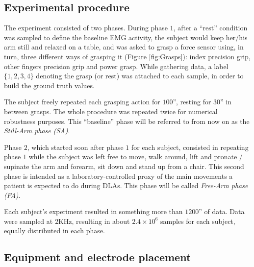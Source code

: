 \documentclass[10pt]{bmc_article}
\def\texttt{[image: ]}
\newenvironment{bmcformat}
  {\begin{raggedright}\baselineskip20pt\sloppy\setboolean{publ}{false}}
  {\end{raggedright}\baselineskip20pt\sloppy}
\begin{document}
\begin{bmcformat}
\subsection*{Experimental procedure}

The experiment consisted of two phases.
During phase $1$, after a ``rest'' condition was sampled to define the baseline
EMG activity, the subject would keep her/his arm still and relaxed
on a table, and was asked to grasp a force sensor using, in turn,
three different ways of grasping it (Figure \ref{fig:Grasps}):
index precision grip, other fingers precision grip and power grasp.
While gathering data, a label $\{1,2,3,4\}$ denoting the grasp (or rest)
was attached to each sample, in order to build the ground truth values.


The subject freely repeated each grasping action for
$100$'', resting for $30$'' in between grasps. The whole procedure was
repeated twice for numerical robustness purposes. This ``baseline''
phase will be referred to from now on as the \emph{Still-Arm phase (SA)}.

Phase $2$, which started soon after phase $1$ for each subject,
consisted in repeating phase $1$ while the subject was left free to
move, walk around, lift and pronate / supinate the
arm and forearm, sit down and stand up from a chair. This 
second phase is intended as a laboratory-controlled proxy 
of the main movements a patient is expected to do during DLAs.
This phase will be called \emph{Free-Arm phase (FA)}.

Each subject's experiment resulted in something more than
$1200$'' of data. Data were sampled at $2$KHz, resulting in
about $2.4\times 10^6$ samples for each subject, equally
distributed in each phase.

\subsection*{Equipment and electrode placement}


\end{bmcformat}
\end{document}
